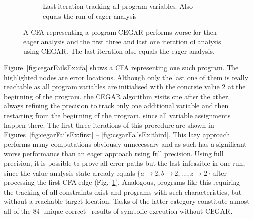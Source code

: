 \begin{figure}
\begin{subfigure}[b]{.48\textwidth}
\caption{Last iteration tracking all program variables. Also equals the run of eager analysis}
\label{fig:cegarFailsEx:eager}
\end{subfigure}
\caption{A CFA representing a program CEGAR performs worse for then eager analysis and the first three
and last one iteration of analysis using CEGAR. The last iteration also equals the eager analysis.}
\label{fig:cegarFailsEx}
\end{figure}

Figure~\ref{fig:cegarFailsEx:cfa} shows a CFA representing one such program. The highlighted nodes are error locations.
Although only the last one of them is really reachable as all program variables are initialised with the concrete value $2$ at the beginning of the program,
the CEGAR algorithm visits one after the other, always refining the precision to track only one additional variable and then restarting
from the beginning of the program, since all variable assignments happen there.
The first three iterations of this procedure are shown in Figures~\ref{fig:cegarFailsEx:first} -- \ref{fig:cegarFailsEx:third}.
This lazy approach performs many computations obviously unnecessary and as such has a significant worse performance than an eager approach using full precision.
Using full precision, it is possible to prove all error paths but the last infeasible in one run, since the value analysis state already equals $\{ a \rightarrow 2, b \rightarrow 2, ..., z \rightarrow 2 \}$ after processing the first CFA edge (Fig.~\ref{fig:cegarFailsEx:eager}).
Analogous, programs like this requiring the tracking of all constraints exist and programs with such characteristics, but without a reachable target location.
Tasks of the latter category constitute almost all of the 84~unique correct \resultTrue\ results of symbolic execution without CEGAR.

